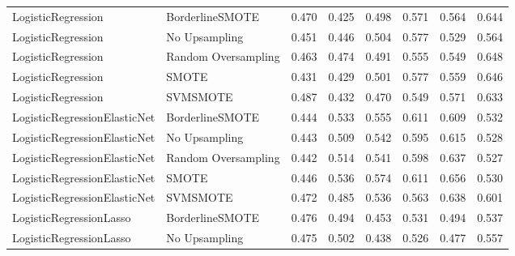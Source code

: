 \begin{tabular}{llllllll}
          LogisticRegression &     BorderlineSMOTE & 0.470 &                     0.425 &                 0.498 &                  0.571 &                                   0.564 &     0.644 \\
          LogisticRegression &       No Upsampling & 0.451 &                     0.446 &                 0.504 &                  0.577 &                                   0.529 &     0.564 \\
          LogisticRegression & Random Oversampling & 0.463 &                     0.474 &                 0.491 &                  0.555 &                                   0.549 &     0.648 \\
          LogisticRegression &               SMOTE & 0.431 &                     0.429 &                 0.501 &                  0.577 &                                   0.559 &     0.646 \\
          LogisticRegression &            SVMSMOTE & 0.487 &                     0.432 &                 0.470 &                  0.549 &                                   0.571 &     0.633 \\
LogisticRegressionElasticNet &     BorderlineSMOTE & 0.444 &                     0.533 &                 0.555 &                  0.611 &                                   0.609 &     0.532 \\
LogisticRegressionElasticNet &       No Upsampling & 0.443 &                     0.509 &                 0.542 &                  0.595 &                                   0.615 &     0.528 \\
LogisticRegressionElasticNet & Random Oversampling & 0.442 &                     0.514 &                 0.541 &                  0.598 &                                   0.637 &     0.527 \\
LogisticRegressionElasticNet &               SMOTE & 0.446 &                     0.536 &                 0.574 &                  0.611 &                                   0.656 &     0.530 \\
LogisticRegressionElasticNet &            SVMSMOTE & 0.472 &                     0.485 &                 0.536 &                  0.563 &                                   0.638 &     0.601 \\
     LogisticRegressionLasso &     BorderlineSMOTE & 0.476 &                     0.494 &                 0.453 &                  0.531 &                                   0.494 &     0.537 \\
     LogisticRegressionLasso &       No Upsampling & 0.475 &                     0.502 &                 0.438 &                  0.526 &                                   0.477 &     0.557 \\

\end{tabular}
